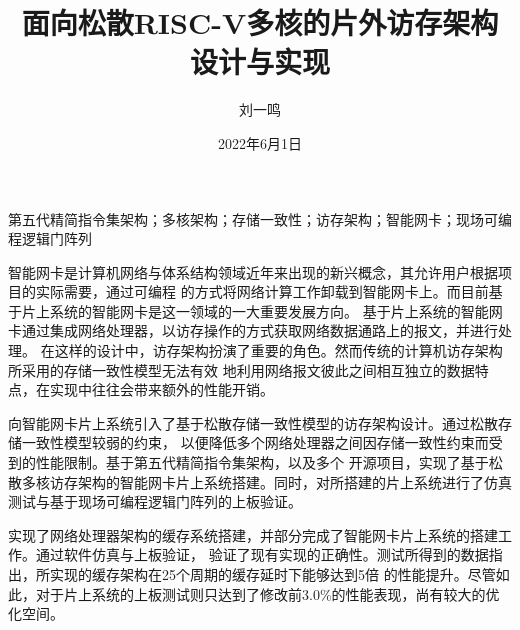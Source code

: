 \documentclass[supercite,notofont,hustthesis]{HustGraduPaper}
\title{面向松散RISC-V多核的片外访存架构\\
设计与实现}
\author{刘一鸣}
\date{2022年6月1日}
\begin{document}
\maketitle

\statement

\clearpage


\begin{cnabstract}{第五代精简指令集架构；多核架构；存储一致性；访存架构；智能网卡；现场可编程逻辑门阵列}

智能网卡是计算机网络与体系结构领域近年来出现的新兴概念，其允许用户根据项目的实际需要，通过可编程
的方式将网络计算工作卸载到智能网卡上。而目前基于片上系统的智能网卡是这一领域的一大重要发展方向。
基于片上系统的智能网卡通过集成网络处理器，以访存操作的方式获取网络数据通路上的报文，并进行处理。
在这样的设计中，访存架构扮演了重要的角色。然而传统的计算机访存架构所采用的存储一致性模型无法有效
地利用网络报文彼此之间相互独立的数据特点，在实现中往往会带来额外的性能开销。

向智能网卡片上系统引入了基于松散存储一致性模型的访存架构设计。通过松散存储一致性模型较弱的约束，
以便降低多个网络处理器之间因存储一致性约束而受到的性能限制。基于第五代精简指令集架构，以及多个
开源项目，实现了基于松散多核访存架构的智能网卡片上系统搭建。同时，对所搭建的片上系统进行了仿真
测试与基于现场可编程逻辑门阵列的上板验证。

实现了网络处理器架构的缓存系统搭建，并部分完成了智能网卡片上系统的搭建工作。通过软件仿真与上板验证，
验证了现有实现的正确性。测试所得到的数据指出，所实现的缓存架构在25个周期的缓存延时下能够达到5倍
的性能提升。尽管如此，对于片上系统的上板测试则只达到了修改前3.0\%的性能表现，尚有较大的优化空间。

\end{cnabstract}
\end{document}
